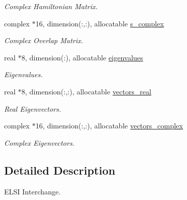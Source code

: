 \begin{DoxyCompactItemize}
\begin{DoxyCompactList}\small\item\em Complex Hamiltonian Matrix. \end{DoxyCompactList}\item 
\hypertarget{namespaceelsi_a420c35eb06860bbb101e042dde751254}{}complex $\ast$16, dimension(\+:,\+:), allocatable \hyperlink{namespaceelsi_a420c35eb06860bbb101e042dde751254}{s\+\_\+complex}\label{namespaceelsi_a420c35eb06860bbb101e042dde751254}

\begin{DoxyCompactList}\small\item\em Complex Overlap Matrix. \end{DoxyCompactList}\item 
\hypertarget{namespaceelsi_aed3c85f67b6805b3de83c43140712d7a}{}real $\ast$8, dimension(\+:), allocatable \hyperlink{namespaceelsi_aed3c85f67b6805b3de83c43140712d7a}{eigenvalues}\label{namespaceelsi_aed3c85f67b6805b3de83c43140712d7a}

\begin{DoxyCompactList}\small\item\em Eigenvalues. \end{DoxyCompactList}\item 
\hypertarget{namespaceelsi_a75d2ea4793597648c8466c4f8510a2f8}{}real $\ast$8, dimension(\+:,\+:), allocatable \hyperlink{namespaceelsi_a75d2ea4793597648c8466c4f8510a2f8}{vectors\+\_\+real}\label{namespaceelsi_a75d2ea4793597648c8466c4f8510a2f8}

\begin{DoxyCompactList}\small\item\em Real Eigenvectors. \end{DoxyCompactList}\item 
\hypertarget{namespaceelsi_ade72ed826776968c28d6406936b5c912}{}complex $\ast$16, dimension(\+:,\+:), allocatable \hyperlink{namespaceelsi_ade72ed826776968c28d6406936b5c912}{vectors\+\_\+complex}\label{namespaceelsi_ade72ed826776968c28d6406936b5c912}

\begin{DoxyCompactList}\small\item\em Complex Eigenvectors. \end{DoxyCompactList}\end{DoxyCompactItemize}


\subsection{Detailed Description}
E\+L\+S\+I Interchange. 

